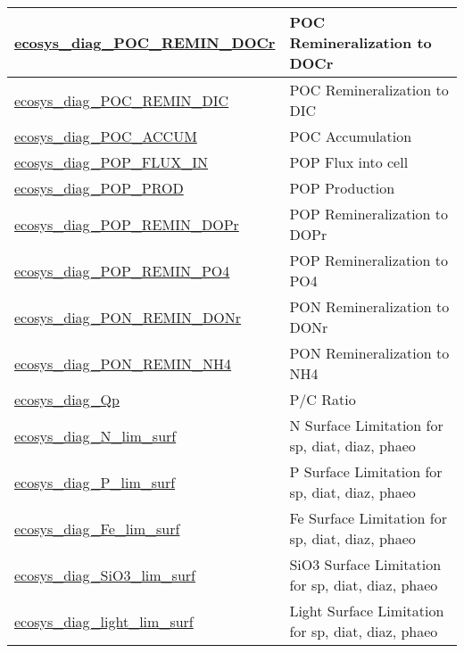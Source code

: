 {\begin{center}
\begin{longtable}{| p{2.0in} | p{4.0in} |}
    \hline
    \hyperref[subsec:var_sec_forcing_ecosys_diag_POC_REMIN_DOCr]{ecosys\_diag\_POC\_REMIN\_\-DOCr} & POC Remineralization to DOCr \\
    \hline
    \hyperref[subsec:var_sec_forcing_ecosys_diag_POC_REMIN_DIC]{ecosys\_diag\_POC\_REMIN\_\-DIC} & POC Remineralization to DIC \\
    \hline
    \hyperref[subsec:var_sec_forcing_ecosys_diag_POC_ACCUM]{ecosys\_diag\_POC\_ACCUM} & POC Accumulation \\
    \hline
    \hyperref[subsec:var_sec_forcing_ecosys_diag_POP_FLUX_IN]{ecosys\_diag\_POP\_FLUX\_IN} & POP Flux into cell \\
    \hline
    \hyperref[subsec:var_sec_forcing_ecosys_diag_POP_PROD]{ecosys\_diag\_POP\_PROD} & POP Production \\
    \hline
    \hyperref[subsec:var_sec_forcing_ecosys_diag_POP_REMIN_DOPr]{ecosys\_diag\_POP\_REMIN\_\-DOPr} & POP Remineralization to DOPr \\
    \hline
    \hyperref[subsec:var_sec_forcing_ecosys_diag_POP_REMIN_PO4]{ecosys\_diag\_POP\_REMIN\_\-PO4} & POP Remineralization to PO4 \\
    \hline
    \hyperref[subsec:var_sec_forcing_ecosys_diag_PON_REMIN_DONr]{ecosys\_diag\_PON\_REMIN\_\-DONr} & PON Remineralization to DONr \\
    \hline
    \hyperref[subsec:var_sec_forcing_ecosys_diag_PON_REMIN_NH4]{ecosys\_diag\_PON\_REMIN\_\-NH4} & PON Remineralization to NH4 \\
    \hline
    \hyperref[subsec:var_sec_forcing_ecosys_diag_Qp]{ecosys\_diag\_Qp} & P/C Ratio \\
    \hline
    \hyperref[subsec:var_sec_forcing_ecosys_diag_N_lim_surf]{ecosys\_diag\_N\_lim\_surf} & N Surface Limitation for sp, diat, diaz, phaeo \\
    \hline
    \hyperref[subsec:var_sec_forcing_ecosys_diag_P_lim_surf]{ecosys\_diag\_P\_lim\_surf} & P Surface Limitation for sp, diat, diaz, phaeo \\
    \hline
    \hyperref[subsec:var_sec_forcing_ecosys_diag_Fe_lim_surf]{ecosys\_diag\_Fe\_lim\_surf} & Fe Surface Limitation for sp, diat, diaz, phaeo \\
    \hline
    \hyperref[subsec:var_sec_forcing_ecosys_diag_SiO3_lim_surf]{ecosys\_diag\_SiO3\_lim\_surf} & SiO3 Surface Limitation for sp, diat, diaz, phaeo \\
    \hline
    \hyperref[subsec:var_sec_forcing_ecosys_diag_light_lim_surf]{ecosys\_diag\_light\_lim\_surf} & Light Surface Limitation for sp, diat, diaz, phaeo \\

\end{longtable}
\end{center}}
